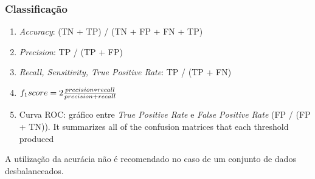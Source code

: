 \subsubsection{Classificação}
\begin{enumerate}
    \item \textit{Accuracy}: (TN + TP) / (TN + FP + FN + TP)
    \item \textit{Precision}: TP / (TP + FP) 
    \item \textit{Recall, Sensitivity, True Positive Rate}: TP / (TP + FN)
    \item $f_1\-score = 2\frac{precision * recall}{precision + recall}$
    \item Curva ROC: gráfico entre \textit{True Positive Rate} e \textit{False Positive Rate} (FP / (FP + TN)). It summarizes all of the confusion matrices that each threshold produced
\end{enumerate}
A utilização da acurácia não é recomendado no caso de um conjunto de dados desbalanceados.

